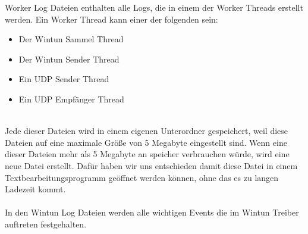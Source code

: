 \newpage

Worker Log Dateien enthalten alle Logs, die in einem der Worker Threads erstellt werden. Ein Worker Thread kann einer der folgenden sein:
\\
\begin{itemize}
    \item Der Wintun Sammel Thread
    \item Der Wintun Sender Thread
    \item Ein UDP Sender Thread
    \item Ein UDP Empfänger Thread
\end{itemize}
\ \\
Jede dieser Dateien wird in einem eigenen Unterordner gespeichert, weil diese Dateien auf eine maximale Größe von 5 Megabyte eingestellt sind. Wenn eine dieser Dateien mehr als 5 Megabyte an speicher verbrauchen würde, wird eine neue Datei erstellt. Dafür haben wir uns entschieden damit diese Datei in einem Textbearbeitungsprogramm geöffnet werden können, ohne das es zu langen Ladezeit kommt.
\\\\
In den Wintun Log Dateien werden alle wichtigen Events die im Wintun Treiber auftreten festgehalten.